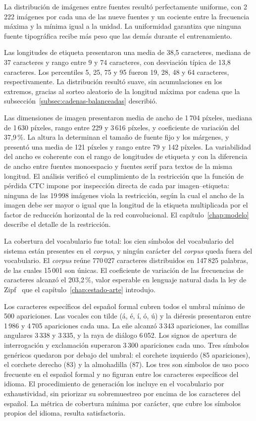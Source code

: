 La distribución de imágenes entre fuentes resultó perfectamente uniforme, con 2\,222 imágenes por cada una de las nueve fuentes y un cociente entre la frecuencia máxima y la mínima igual a la unidad. La uniformidad garantiza que ninguna fuente tipográfica recibe más peso que las demás durante el entrenamiento.

Las longitudes de etiqueta presentaron una media de 38,5 caracteres, mediana de 37 caracteres y rango entre 9 y 74 caracteres, con desviación típica de 13,8 caracteres. Los percentiles 5, 25, 75 y 95 fueron 19, 28, 48 y 64 caracteres, respectivamente. La distribución resultó suave, sin acumulaciones en los extremos, gracias al sorteo aleatorio de la longitud máxima por cadena que la subsección~\ref{subsec:cadenas-balanceadas} describió.

Las dimensiones de imagen presentaron media de ancho de 1\,704 píxeles, mediana de 1\,630 píxeles, rango entre 229 y 3\,616 píxeles, y coeficiente de variación del 37,9\,\%. La altura la determinan el tamaño de fuente fijo y los márgenes, y presentó una media de 121 píxeles y rango entre 79 y 142 píxeles. La variabilidad del ancho es coherente con el rango de longitudes de etiqueta y con la diferencia de ancho entre fuentes monoespacio y fuentes serif para textos de la misma longitud. El análisis verificó el cumplimiento de la restricción que la función de pérdida CTC impone por inspección directa de cada par imagen--etiqueta: ninguna de las 19\,998 imágenes viola la restricción, según la cual el ancho de la imagen debe ser mayor o igual que la longitud de la etiqueta multiplicada por el factor de reducción horizontal de la red convolucional. El capítulo~\ref{chap:modelo} describe el detalle de la restricción.

La cobertura del vocabulario fue total: los cien símbolos del vocabulario del sistema están presentes en el \textit{corpus}, y ningún carácter del \textit{corpus} queda fuera del vocabulario. El \textit{corpus} reúne 770\,027 caracteres distribuidos en 147\,825 palabras, de las cuales 15\,001 son únicas. El coeficiente de variación de las frecuencias de caracteres alcanzó el 203,2\,\%, valor esperable en lenguaje natural dada la ley de Zipf~\cite{zipf1949human} que el capítulo~\ref{chap:estado-arte} introdujo.

Los caracteres específicos del español formal cubren todos el umbral mínimo de 500 apariciones. Las vocales con tilde (á, é, í, ó, ú) y la diéresis presentaron entre 1\,986 y 4\,705 apariciones cada una. La eñe alcanzó 3\,343 apariciones, las comillas angulares 3\,338 y 3\,335, y la raya de diálogo 6\,052. Los signos de apertura de interrogación y exclamación superaron 3\,300 apariciones cada uno. Tres símbolos genéricos quedaron por debajo del umbral: el corchete izquierdo (85 apariciones), el corchete derecho (83) y la almohadilla (87). Los tres son símbolos de uso poco frecuente en el español formal y no figuran entre los caracteres específicos del idioma. El procedimiento de generación los incluye en el vocabulario por exhaustividad, sin priorizar su sobremuestreo por encima de los caracteres del español. La métrica de cobertura mínima por carácter, que cubre los símbolos propios del idioma, resulta satisfactoria.

